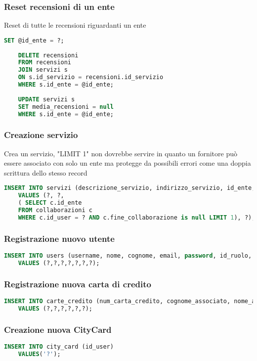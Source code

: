 \subsubsection{Reset recensioni di un ente}
Reset di tutte le recensioni riguardanti un ente
\begin{lstlisting}[language=SQL]
	SET @id_ente = ?;
	
	DELETE recensioni 
	FROM recensioni
	JOIN servizi s
	ON s.id_servizio = recensioni.id_servizio
	WHERE s.id_ente = @id_ente;
	
	UPDATE servizi s
	SET media_recensioni = null
	WHERE s.id_ente = @id_ente;
\end{lstlisting}




\subsubsection{Creazione servizio}
Crea un servizio, "LIMIT 1" non dovrebbe servire in quanto un fornitore può essere
associato con solo un ente ma protegge da possibili errori come una doppia scrittura dello stesso record
\begin{lstlisting}[language=SQL]
	INSERT INTO servizi (descrizione_servizio, indirizzo_servizio, id_ente, prezzo_servizio) 
	VALUES (?, ?, 
	( SELECT c.id_ente
	FROM collaborazioni c
	WHERE c.id_user = ? AND c.fine_collaborazione is null LIMIT 1), ?);
\end{lstlisting}

\subsubsection{Registrazione nuovo utente}
\begin{lstlisting}[language=SQL]
	INSERT INTO users (username, nome, cognome, email, password, id_ruolo, data_creazione) 
	VALUES (?,?,?,?,?,?,?);
\end{lstlisting}

\subsubsection{Registrazione nuova carta di credito}
\begin{lstlisting}[language=SQL]
	INSERT INTO carte_credito (num_carta_credito, cognome_associato, nome_associato, mese_scadenza, anno_scadenza, id_user) 
	VALUES (?,?,?,?,?,?);
\end{lstlisting}

\subsubsection{Creazione nuova CityCard}
\begin{lstlisting}[language=SQL]
	INSERT INTO city_card (id_user) 
	VALUES('?');
\end{lstlisting}

